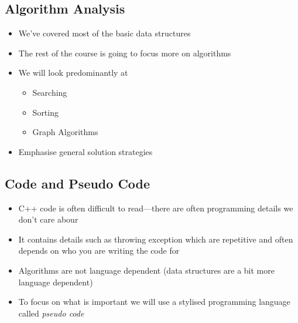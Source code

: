 \begin{slide}
\section{Algorithm Analysis}

\begin{PauseHighLight}
  \begin{itemize}
  \item We've covered most of the basic data structures\pause
  \item The rest of the course is going to focus more on
    algorithms\pause
  \item We will look predominantly at
    \begin{itemize}
    \item Searching
    \item Sorting
    \item Graph Algorithms\pause
    \end{itemize}
  \item Emphasise general solution strategies\pause
  \end{itemize}
\end{PauseHighLight}

\end{slide}


\begin{slide}
\section{Code and Pseudo Code}

\begin{PauseHighLight}
  \begin{itemize}
  \item C++ code is often difficult to read---there are often
    programming details we don't care abour\pause
  \item It contains details such as throwing exception which are
    repetitive and often depends on who you are writing the code
    for\pause
  \item Algorithms are not language dependent (data structures are a bit
    more language dependent)\pause
  \item To focus on what is important we will use a stylised programming
    language called \emph{pseudo code}\pause
  \end{itemize}
\end{PauseHighLight}

\end{slide}

